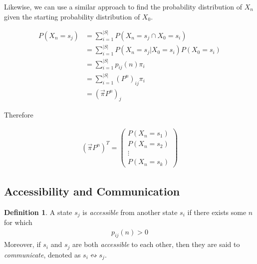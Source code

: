\documentclass[a4paper,12pt]{article}
\theoremstyle{definition}
\newtheorem{definition}{Definition}[subsection]
\begin{document}
Likewise, we can use a similar approach to find the probability distribution of $X_n$ given the starting probability distribution of $X_0$. 

	\begin{equation*}
	\begin{aligned}
		P(X_n = s_j) &= \sum_{i=1}^{|S|} P(X_n = s_j \cap X_0 = s_i) \\
				 	 &= \sum_{i=1}^{|S|} P(X_n = s_j | X_0 = s_i)P(X_0 = s_i) \\
			     	 &= \sum_{i=1}^{|S|} p_{ij}(n)\pi_i \\
			     	 &= \sum_{i=1}^{|S|} (P^n)_{ij}\pi_i \\
			     	 &= (\vec{\pi}P^n)_j
	\end{aligned}
	\end{equation*}	
	
	Therefore
	
	\begin{equation*}
	\begin{aligned}
		 (\vec{\pi}P^n)^T =
		 \begin{pmatrix}
		 P(X_n = s_1) \\
		 P(X_n = s_2) \\ 
		 \vdots \\
		 P(X_n = s_k)
		 \end{pmatrix}
	\end{aligned}
	\end{equation*}
	
\subsection{Accessibility and Communication}

	\begin{definition}
		A state $s_j$ is \emph{accessible} from another state $s_i$ if there exists some $n$ for which
		\begin{equation*}
			\begin{aligned}
				p_{ij}(n) > 0
			\end{aligned}
			\end{equation*}
		Moreover, if $s_i$ and $s_j$ are both \emph{accessible} to each other, then they are said to \emph{communicate}, denoted as $s_i \leftrightsquigarrow s_j$.
	\end{definition}
	
\end{document}
